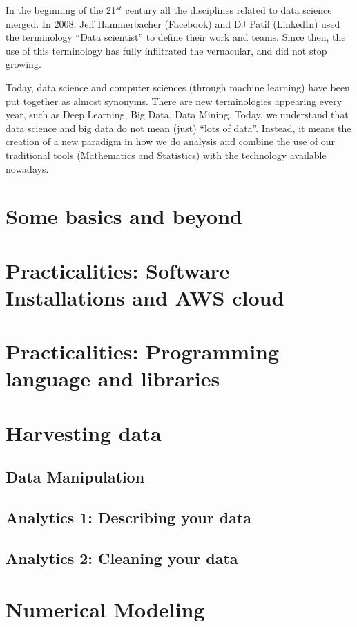 \documentclass[10pt]{PhDthesisPSnPDF}%
\begin{document}
In the beginning of the 21$^{st}$ century all the disciplines related to data science merged. In 2008, Jeff Hammerbacher (Facebook) and DJ Patil (LinkedIn) used the terminology ``Data scientist'' to define their work and teams. Since then, the use of this terminology has fully infiltrated the vernacular, and did not stop growing. 

Today, data science and computer sciences (through machine learning) have been put together as almost synonyms. There are new terminologies appearing every year, such as Deep Learning, Big Data, Data Mining. Today, we understand that data science and big data do not mean (just) ``lots of data''. Instead, it means the creation of a new paradigm in how we do analysis and combine the use of our traditional tools (Mathematics and Statistics) with the technology available nowadays.




\chapter{Some basics and beyond}\label{basics}
\chapter{Practicalities: Software Installations and AWS cloud}\label{P1}
\chapter{Practicalities: Programming language and libraries}\label{P2}
\chapter{Harvesting data} \label{harvesting}
\section{Data Manipulation}\label{dataM} 
\section{Analytics 1: Describing your data}\label{Analy.1}
\section{Analytics 2: Cleaning your data}\label{Analy.2}
\chapter{Numerical Modeling}\label{numerics}
\end{document}
